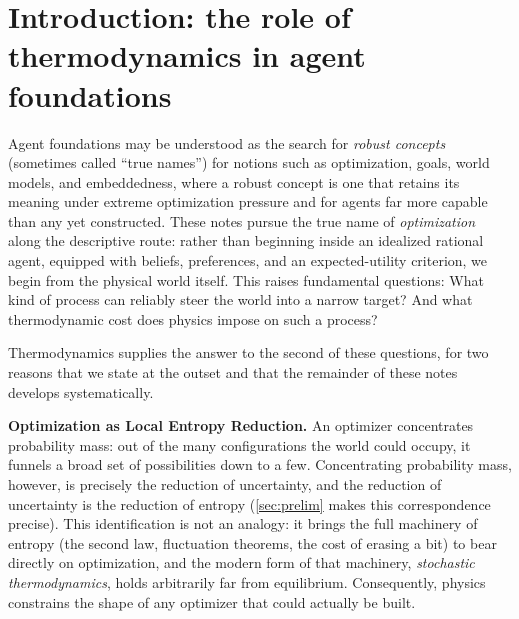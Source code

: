 \documentclass[11pt]{article}
\begin{document}
\begin{abstract}
establish that agents with greater knowledge of the world possess correspondingly greater capacity to act upon it, with the exchange rate between the two set by thermodynamics.
\end{abstract}

\tableofcontents

\section{Introduction: the role of thermodynamics in agent foundations}
\label{sec:intro}

Agent foundations may be understood as the search for \emph{robust concepts} (sometimes called ``true names'') for notions such as optimization, goals, world models, and embeddedness, where a robust concept is one that retains its meaning under extreme optimization pressure and for agents far more capable than any yet constructed. These notes pursue the true name of \emph{optimization} along the descriptive route: rather than beginning inside an idealized rational agent, equipped with beliefs, preferences, and an expected-utility criterion, we begin from the physical world itself. This raises fundamental questions: What kind of process can reliably steer the world into a narrow target? And what thermodynamic cost does physics impose on such a process?

Thermodynamics supplies the answer to the second of these questions, for two reasons that we state at the outset and that the remainder of these notes develops systematically.

\textbf{Optimization as Local Entropy Reduction.} An optimizer concentrates probability mass: out of the many configurations the world could occupy, it funnels a broad set of possibilities down to a few. Concentrating probability mass, however, is precisely the reduction of uncertainty, and the reduction of uncertainty is the reduction of entropy (\cref{sec:prelim} makes this correspondence precise). This identification is not an analogy: it brings the full machinery of entropy (the second law, fluctuation theorems, the cost of erasing a bit) to bear directly on optimization, and the modern form of that machinery, \emph{stochastic thermodynamics}, holds arbitrarily far from equilibrium. Consequently, physics constrains the shape of any optimizer that could actually be built.
\end{document}
